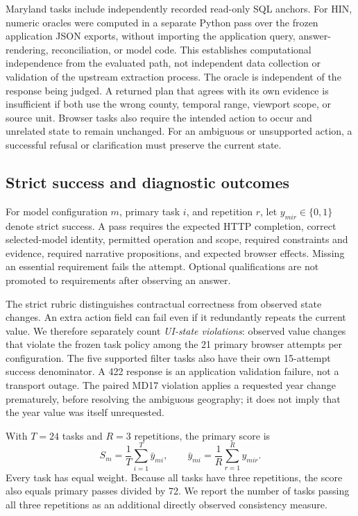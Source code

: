 \documentclass[10pt,twocolumn,letterpaper]{article}
\begin{document}
Maryland tasks include independently recorded read-only SQL anchors. For HIN, numeric oracles were computed in a separate Python pass over the frozen application JSON exports, without importing the application query, answer-rendering, reconciliation, or model code. This establishes computational independence from the evaluated path, not independent data collection or validation of the upstream extraction process. The oracle is independent of the response being judged. A returned plan that agrees with its own evidence is insufficient if both use the wrong county, temporal range, viewport scope, or source unit. Browser tasks also require the intended action to occur and unrelated state to remain unchanged. For an ambiguous or unsupported action, a successful refusal or clarification must preserve the current state.

\subsection{Strict success and diagnostic outcomes}
For model configuration $m$, primary task $i$, and repetition $r$, let $y_{mir}\in\{0,1\}$ denote strict success. A pass requires the expected HTTP completion, correct selected-model identity, permitted operation and scope, required constraints and evidence, required narrative propositions, and expected browser effects. Missing an essential requirement fails the attempt. Optional qualifications are not promoted to requirements after observing an answer.

The strict rubric distinguishes contractual correctness from observed state changes. An extra action field can fail even if it redundantly repeats the current value. We therefore separately count \emph{UI-state violations}: observed value changes that violate the frozen task policy among the 21 primary browser attempts per configuration. The five supported filter tasks also have their own 15-attempt success denominator. A 422 response is an application validation failure, not a transport outage. The paired MD17 violation applies a requested year change prematurely, before resolving the ambiguous geography; it does not imply that the year value was itself unrequested.

With $T=24$ tasks and $R=3$ repetitions, the primary score is
\begin{equation}
 S_m=\frac{1}{T}\sum_{i=1}^{T}\bar y_{mi},\qquad
 \bar y_{mi}=\frac{1}{R}\sum_{r=1}^{R}y_{mir}.
\end{equation}
Every task has equal weight. Because all tasks have three repetitions, the score also equals primary passes divided by 72. We report the number of tasks passing all three repetitions as an additional directly observed consistency measure.
\end{document}
